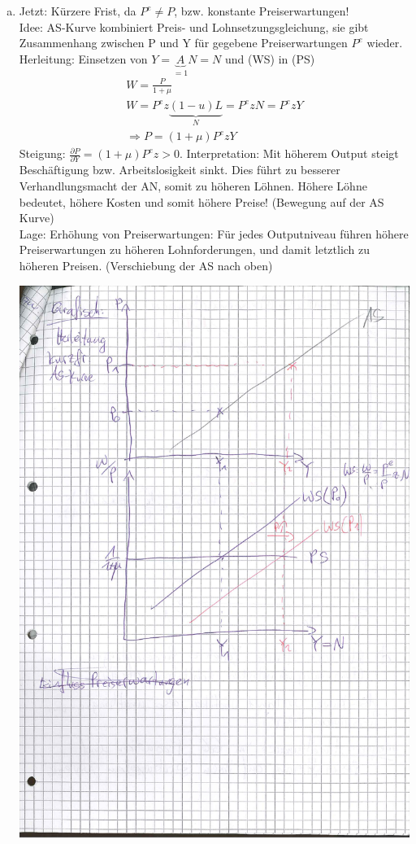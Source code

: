 \documentclass{scrartcl}
\begin{document}
\begin{enumerate}[a)]
  \item Jetzt: K\"{u}rzere Frist, da $P^e \neq P$, bzw. konstante Preiserwartungen!\\
  Idee: AS-Kurve kombiniert Preis- und Lohnsetzungsgleichung, sie gibt Zusammenhang zwischen P und Y f\"{u}r gegebene Preiserwartungen $P^e$ wieder.\\
  Herleitung: Einsetzen von $Y=\underbrace{A}_{=1}N = N$ und (WS) in (PS)
  \begin{align*}
    W = \frac{P}{1+\mu}\\
    W = P^e z\underbrace{(1-u)L}_{N} = P^e z N = P^e z Y\\
    \Rightarrow P =(1+\mu)P^e z Y
  \end{align*}
  Steigung: $\frac{\partial P}{\partial Y} = (1+\mu) P^e z > 0$. Interpretation: Mit h\"{o}herem Output steigt Besch\"{a}ftigung bzw. Arbeitslosigkeit sinkt. Dies f\"{u}hrt zu besserer Verhandlungsmacht der AN, somit zu h\"{o}heren L\"{o}hnen. H\"{o}here L\"{o}hne bedeutet, h\"{o}here Kosten und somit h\"{o}here Preise! (Bewegung auf der AS Kurve)\\
  Lage: Erh\"{o}hung von Preiserwartungen: F\"{u}r jedes Outputniveau f\"{u}hren h\"{o}here Preiserwartungen zu h\"{o}heren Lohnforderungen, und damit letztlich zu h\"{o}heren Preisen. (Verschiebung der AS nach oben)
  \begin{center}
  \includegraphics[width=\textwidth]{Bilder/ASkurzeFrist.pdf}

\end{center}
\end{enumerate}
\end{document}
